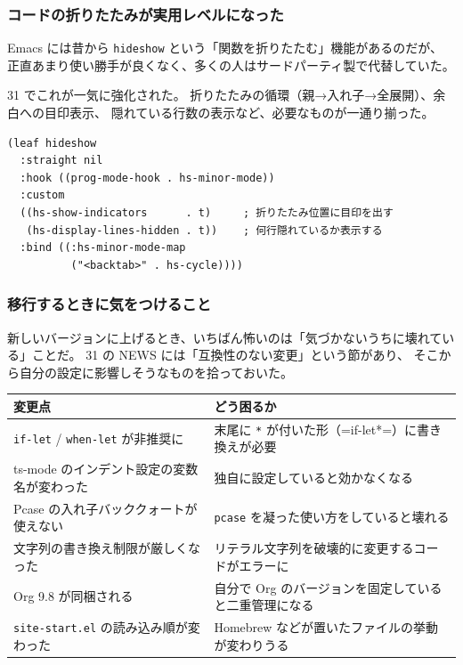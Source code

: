\documentclass[11pt]{article}
\begin{document}
\subsubsection{コードの折りたたみが実用レベルになった}
\label{sec:org52a6e6c}

Emacs には昔から \texttt{hideshow} という「関数を折りたたむ」機能があるのだが、
正直あまり使い勝手が良くなく、多くの人はサードパーティ製で代替していた。

31 でこれが一気に強化された。
折りたたみの循環（親→入れ子→全展開）、余白への目印表示、
隠れている行数の表示など、必要なものが一通り揃った。

\begin{verbatim}
(leaf hideshow
  :straight nil
  :hook ((prog-mode-hook . hs-minor-mode))
  :custom
  ((hs-show-indicators      . t)     ; 折りたたみ位置に目印を出す
   (hs-display-lines-hidden . t))    ; 何行隠れているか表示する
  :bind ((:hs-minor-mode-map
          ("<backtab>" . hs-cycle))))
\end{verbatim}
\subsubsection{移行するときに気をつけること}
\label{sec:orgd536905}

新しいバージョンに上げるとき、いちばん怖いのは「気づかないうちに壊れている」ことだ。
31 の NEWS には「互換性のない変更」という節があり、
そこから自分の設定に影響しそうなものを拾っておいた。

\begin{center}
\begin{tabular}{ll}
変更点 & どう困るか\\
\hline
\texttt{if-let} / \texttt{when-let} が非推奨に & 末尾に \texttt{*} が付いた形（=if-let*=）に書き換えが必要\\
ts-mode のインデント設定の変数名が変わった & 独自に設定していると効かなくなる\\
Pcase の入れ子バッククォートが使えない & \texttt{pcase} を凝った使い方をしていると壊れる\\
文字列の書き換え制限が厳しくなった & リテラル文字列を破壊的に変更するコードがエラーに\\
Org 9.8 が同梱される & 自分で Org のバージョンを固定していると二重管理になる\\
\texttt{site-start.el} の読み込み順が変わった & Homebrew などが置いたファイルの挙動が変わりうる\\
\end{tabular}
\end{center}
\end{document}
